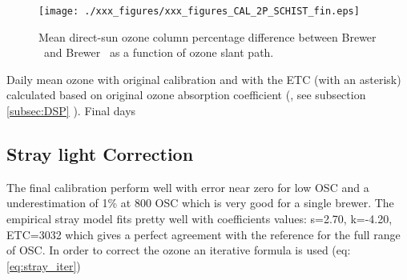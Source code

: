  

\begin{figure}[hbtp!]
\begin{center}   
		\texttt{[image: ./xxx\_figures/xxx\_figures\_CAL\_2P\_SCHIST\_fin.eps]}
		\caption{Mean direct-sun ozone column percentage difference between Brewer \brwname\ and Brewer \brwref\ as a function of ozone slant path.} 
		\label{fig:CAL_2P_SCHIST_fin}
\end{center}
\end{figure}

\begin{table}[hbtp!] \centering
		\caption{Daily mean ozone with original calibration and with the ETC (with an asterisk) calculated based on original ozone absorption coefficient (\textbf{\Adef}, see subsection \ref{subsec:DSP} ). Final days}
		\label{tab:table_ETCdata_fin}
		
\end{table}
\newpage

\subsection{Stray light Correction} \label{sec:stray}

The final calibration perform well with error near zero for low OSC and a underestimation of 1\% at 800 OSC which is very good for a single brewer. The empirical stray model fits  pretty well with coefficients values:  s=2.70, k=-4.20, ETC=3032  which gives a perfect agreement with the reference for the full range of OSC. In order to correct the ozone an iterative formula is used (eq: \ref{eq:stray_iter})

